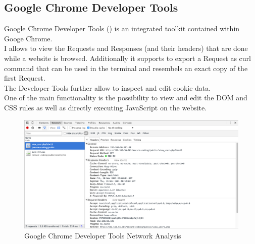 \subsection{Google Chrome Developer Tools}
Google Chrome Developer Tools () is an integrated toolkit contained within Googe Chrome.\\
I allows to view the Requests and Responses (and their headers) that are done while a website is browsed. Additionally it supports to export a Request as curl command that can be used in the terminal and resembels an exact copy of the first Request.\\
The Developer Tools further allow to inspect and edit cookie data.\\
One of the main functionality is the possibility to view and edit the DOM and CSS rules as well as directly executing JavaScript on the website.
\begin{figure}[ht]
	\centering
	\includegraphics[width=.8\linewidth]{figures/tool_chrome_dev_tools.png}
	\caption{Google Chrome Developer Tools Network Analysis}
	\label{fig:tool_chrome_dev_tools}
\end{figure}
